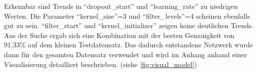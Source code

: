 \begin{table}
    \centering
    \caption{Die besten fünf Ergebnisse der zufälligen Gittersuche mit der Genauigkeit auf den 3000 Testdaten und den zugehörigen Hyperparametern}
    \label{tab:grid_search}
\end{table}

Erkennbar sind Trends in \enquote{dropout\_start} und \enquote{learning\_rate} zu niedrigen Werten.
Die Parameter \enquote{kernel\_size}=3 und \enquote{filter\_levels}=4 scheinen ebenfalls gut zu sein.
\enquote{filter\_start} und \enquote{kernel\_initializer} zeigen keine deutlichen Trends.
Aus der Suche ergab sich eine Kombination mit der besten Genauigkeit von 91,33\% auf dem kleinen Testdatensatz.
Das dadurch entstandene Netzwerk wurde dann für den gesamten Datensatz verwendet und wird im Anhang anhand einer Visualisierung detailliert beschrieben. (siehe \autoref{fig:visual_model})

